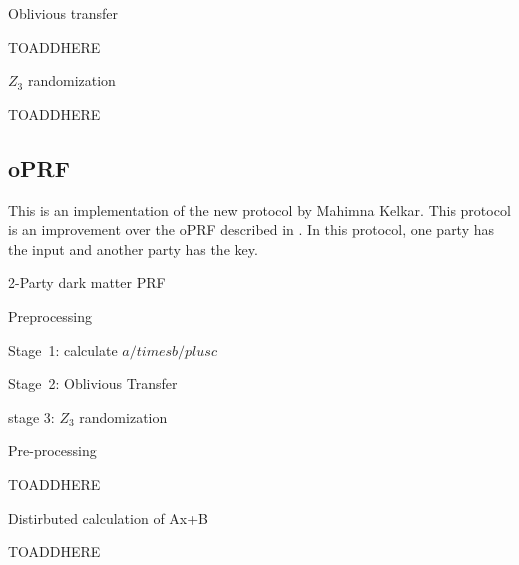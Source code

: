 \begin{algorithm}
	\caption{Oblivious transfer}
	\begin{algorithmic}
		
		\STATE TOADDHERE
		
	\end{algorithmic}
\end{algorithm}


\begin{algorithm}
	\caption{$Z_3$ randomization}
	\begin{algorithmic}
		
		\STATE TOADDHERE
		
	\end{algorithmic}
\end{algorithm}



\subsection{oPRF}
This is an implementation of the new protocol by Mahimna Kelkar. This protocol is an improvement over the oPRF described in \cite{darkmatter}. In this protocol, one party has the input and another party has the key.

\begin{algorithm}
	\caption{2-Party dark matter PRF}
	\begin{algorithmic}
		
		\STATE Preprocessing
		
		\STATE Stage\ 1: calculate $a /times b /plus c$
		
		\STATE Stage\ 2: Oblivious Transfer
		
		\STATE stage 3: $Z_3$ randomization  
		
	\end{algorithmic}
\end{algorithm}

\begin{algorithm}
	\caption{Pre-processing}
	\begin{algorithmic}
		
		\STATE TOADDHERE
		
	\end{algorithmic}
\end{algorithm}

\begin{algorithm}
	\caption{Distirbuted calculation of Ax+B}
	\begin{algorithmic}
		
		\STATE TOADDHERE
		
	\end{algorithmic}
\end{algorithm}


